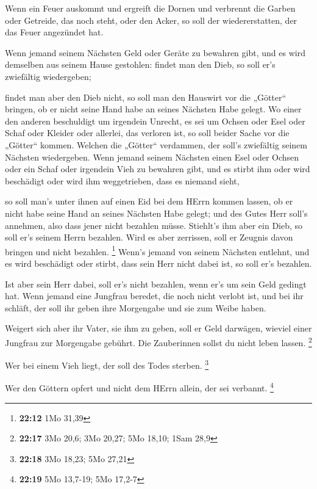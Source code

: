  Wenn ein Feuer auskommt und ergreift die Dornen und
verbrennt die Garben oder Getreide, das noch steht, oder den Acker, so
soll der wiedererstatten, der das Feuer angezündet hat.

 Wenn jemand seinem Nächsten Geld oder Geräte zu bewahren
gibt, und es wird demselben aus seinem Hause gestohlen: findet man den
Dieb, so soll er's zwiefältig wiedergeben;

 findet man aber den Dieb nicht, so soll man den Hauswirt
vor die „Götter`` bringen, ob er nicht seine Hand habe an seines
Nächsten Habe gelegt.  Wo einer den anderen beschuldigt um
irgendein Unrecht, es sei um Ochsen oder Esel oder Schaf oder Kleider
oder allerlei, das verloren ist, so soll beider Sache vor die „Götter``
kommen. Welchen die „Götter`` verdammen, der soll's zwiefältig seinem
Nächsten wiedergeben.  Wenn jemand seinem Nächsten einen
Esel oder Ochsen oder ein Schaf oder irgendein Vieh zu bewahren gibt,
und es stirbt ihm oder wird beschädigt oder wird ihm weggetrieben, dass
es niemand sieht,

 so soll man's unter ihnen auf einen Eid bei dem HErrn
kommen lassen, ob er nicht habe seine Hand an seines Nächsten Habe
gelegt; und des Gutes Herr soll's annehmen, also dass jener nicht
bezahlen müsse.  Stiehlt's ihm aber ein Dieb, so soll er's
seinem Herrn bezahlen.  Wird es aber zerrissen, soll er
Zeugnis davon bringen und nicht bezahlen. \footnote{\textbf{22:12} 1Mo
  31,39}  Wenn's jemand von seinem Nächsten entlehnt, und
es wird beschädigt oder stirbt, dass sein Herr nicht dabei ist, so soll
er's bezahlen.

 Ist aber sein Herr dabei, soll er's nicht bezahlen, wenn
er's um sein Geld gedingt hat.  Wenn jemand eine Jungfrau
beredet, die noch nicht verlobt ist, und bei ihr schläft, der soll ihr
geben ihre Morgengabe und sie zum Weibe haben.

 Weigert sich aber ihr Vater, sie ihm zu geben, soll er
Geld darwägen, wieviel einer Jungfrau zur Morgengabe gebührt.
 Die Zauberinnen sollst du nicht leben lassen. \footnote{\textbf{22:17}
  3Mo 20,6; 3Mo 20,27; 5Mo 18,10; 1Sam 28,9}

 Wer bei einem Vieh liegt, der soll des Todes sterben.
\footnote{\textbf{22:18} 3Mo 18,23; 5Mo 27,21}

 Wer den Göttern opfert und nicht dem HErrn allein, der sei
verbannt. \footnote{\textbf{22:19} 5Mo 13,7-19; 5Mo 17,2-7}

